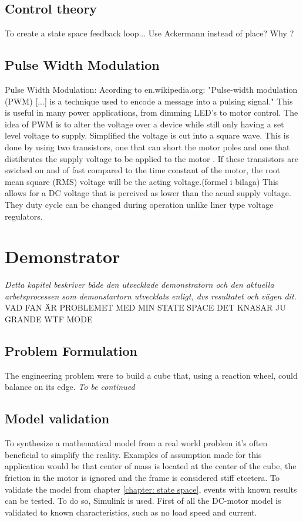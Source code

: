 \documentclass[a4paper,11pt]{kth-mag}
\begin{document}
\section{Control theory}
To create a state space feedback loop...
Use Ackermann instead of place? Why ?

\section{Pulse Width Modulation}
Pulse Width Modulation:
Acording to en.wikipedia.org: "Pulse-width modulation (PWM) [...] is a technique used to encode a message into a 
pulsing signal."
This is useful in many power applications, from dimming LED's to motor control. The idea of 
PWM is to alter the voltage over a device while still only having a set level voltage to supply. Simplified  
the voltage is cut into a square wave. This is done by using two transistors, one that can short the motor poles and one that distibrutes the supply voltage to be applied to the motor \cite{elektro}. If these transistors are swiched on and of fast 
compared to the time constant of the motor, the root mean square (RMS) voltage will be the acting voltage.(formel i bilaga)
This allows for a DC voltage that is percived as lower than the acual supply voltage.
They duty cycle can be changed during operation unlike liner type voltage regulators. 
 
\chapter{Demonstrator}
\emph{Detta kapitel beskriver både den utvecklade demonstratorn och den aktuella arbetsprocessen som demonstartorn utvecklats enligt, dvs resultatet och vägen dit.}
VAD FAN ÄR PROBLEMET MED MIN STATE SPACE DET KNASAR JU GRANDE WTF MODE

\section{Problem Formulation}

The engineering problem were to build a cube that, using a reaction wheel, could balance on its edge.
\emph{To be continued}


\section{Model validation}
To synthesize a mathematical model from a real world problem it's often beneficial to simplify the reality. Examples of assumption made for this application would be that center of mass is located at the center of the cube, the friction in the motor is ignored and the frame is considered stiff etcetera. 
To validate the model from chapter \ref{chapter: state space}, events with known results can be tested. To do so, Simulink \cite{MATLAB:2014} is used.
First of all the DC-motor model is validated to known characteristics, such as no load speed and current. 
\end{document}
